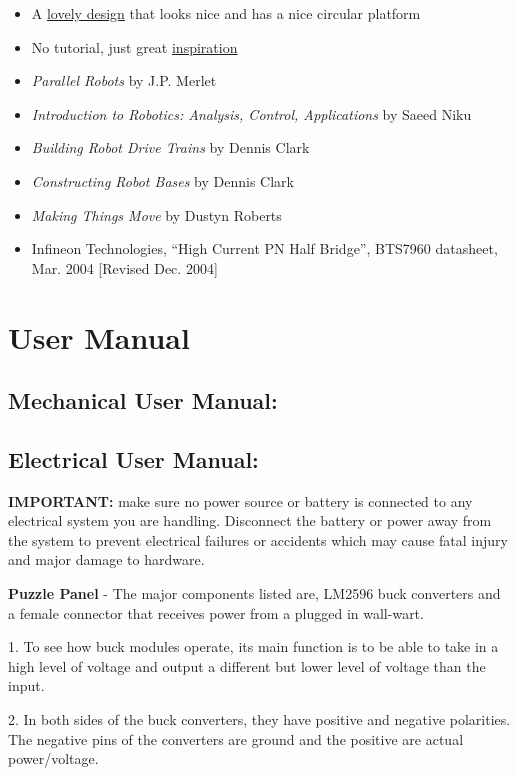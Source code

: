 \documentclass[a4paper, 10pt]{article}
\begin{document}
\begin{itemize}
		\item A \href{https://www.mdpi.com/2218-6581/7/2/30}{lovely design} that looks nice and has a nice circular platform
		\item No tutorial, just great \href{https://www.youtube.com/watch?v=kscvCQTtVvw&t=0s}{inspiration}
		\item \textit{Parallel Robots} by J.P. Merlet
		\item \textit{Introduction to Robotics: Analysis, Control, Applications} by Saeed Niku
		\item \textit{Building Robot Drive Trains} by Dennis Clark
		\item \textit{Constructing Robot Bases} by Dennis Clark
		\item \textit{Making Things Move} by Dustyn Roberts		
		\item Infineon Technologies, ``High Current PN Half Bridge'', BTS7960 datasheet, Mar. 2004 [Revised Dec. 2004]
	\end{itemize}	

\section{User Manual}

	\subsection{Mechanical User Manual:}
	
	\subsection{Electrical User Manual:}

\textbf{IMPORTANT:} make sure no power source or battery is connected to any electrical system you are handling. Disconnect the battery or power away from the system to prevent electrical failures or accidents which may cause fatal injury and major damage to hardware.  

\textbf{Puzzle Panel} - The major components listed are, LM2596 buck converters and a female connector that receives power from a plugged in wall-wart.

1. To see how buck modules operate, its main function is to be able to take in a high level of voltage and output a different but lower level of voltage than the input. 

2. In both sides of the buck converters, they have positive and negative polarities. The negative pins of the converters are ground and the positive are actual power/voltage.  
\end{document}
